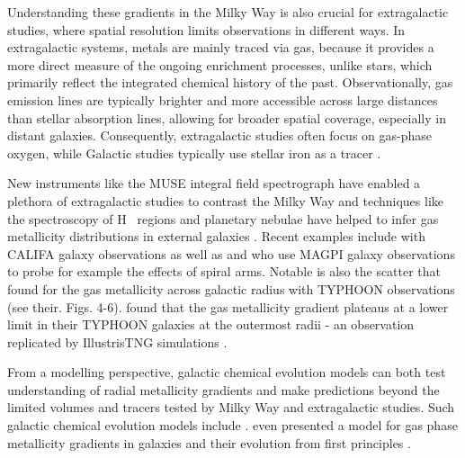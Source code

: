 \documentclass[twocolumn,apj,numberedappendix,appendixfloats]{openjournal}
\begin{document}
\begin{CJK*}{UTF8}{gbsn}
Understanding these gradients in the Milky Way is also crucial for extragalactic studies, where spatial resolution limits observations in different ways. In extragalactic systems, metals are mainly traced via gas, because it provides a more direct measure of the ongoing enrichment processes, unlike stars, which primarily reflect the integrated chemical history of the past. Observationally, gas emission lines are typically brighter and more accessible across large distances than stellar absorption lines, allowing for broader spatial coverage, especially in distant galaxies. Consequently, extragalactic studies often focus on gas-phase oxygen, while Galactic studies typically use stellar iron as a tracer \citep[e.g.][]{Nicholls2017, FraserMcKelvie2022}.

New instruments like the MUSE integral field spectrograph have enabled a plethora of extragalactic studies to contrast the Milky Way and techniques like the spectroscopy of H~{} regions and planetary nebulae have helped to infer gas metallicity distributions in external galaxies \citep{Shaver1983, Vilchez1996, Rolleston2000, Bresolin2012}. Recent examples include \citet{Sanchez2014} with CALIFA galaxy observations as well as \citet{Mun2024} and \citet{Chen2024} who use MAGPI galaxy observations to probe for example the effects of spiral arms. Notable is also the scatter that \citet{Chen2023} found for the gas metallicity across galactic radius with TYPHOON observations (see their. Figs. 4-6). \citet{Grasha2022} found that the gas metallicity gradient plateaus at a lower limit in their TYPHOON galaxies at the outermost radii - an observation replicated by IllustrisTNG simulations \citep{Hemler2021, Garcia2023}.

From a modelling perspective, galactic chemical evolution models can both test understanding of radial metallicity gradients and make predictions beyond the limited volumes and tracers tested by Milky Way and extragalactic studies. Such galactic chemical evolution models include \citet{Chiappini2001, Matteucci2001b, Minchev2014b, Kubryk2015, Stanghellini2015, Rybizki2017, Johnson2024}. \citet{Sharda2021} even presented a model for gas phase metallicity gradients in galaxies and their evolution from first principles \citep[see also][]{Krumholz2018b}. 


\end{CJK*}
\end{document}
